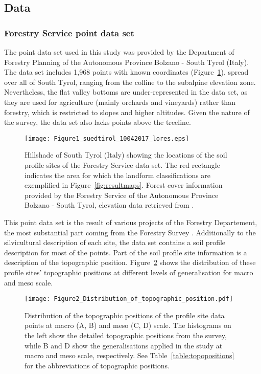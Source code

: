 \documentclass[preprint,12pt,authoryear]{elsarticle}
\begin{document}
\subsection{Data}
\subsubsection{Forestry Service point data set}
The point data set used in this study was provided by the Department of Forestry Planning of the Autonomous Province Bolzano - South Tyrol (Italy).
The data set includes 1,968 points with known coordinates (Figure~\ref{fig:datapoints}), spread over all of South Tyrol, ranging from the colline to the subalpine elevation zone. Nevertheless, the flat valley bottoms are under-represented in the data set, as they are used for agriculture (mainly orchards and vineyards) rather than forestry, which is restricted to slopes and higher altitudes. Given the nature of the survey, the data set also lacks points above the treeline.
\begin{figure}
\texttt{[image: Figure1\_suedtirol\_10042017\_lores.eps]}
\caption{Hillshade of South Tyrol (Italy) showing the locations of the soil profile sites of the Forestry Service data set. The red rectangle indicates the area for which the landform classifications are exemplified in Figure~\ref{fig:resultmaps}. Forest cover information provided by the Forestry Service of the Autonomous Province Bolzano - South Tyrol, elevation data retrieved from \cite{DTM}.}
\label{fig:datapoints}
\end{figure}
 This point data set is the result of  various projects of the Forestry Departement, the most substantial part coming from the Forestry Survey \citep{APB2006}. Additionally to the silvicultural description of each site, the data set contains a soil profile description for most of the points. Part of the soil profile site information is a description of the topographic position. Figure~\ref{fig:hist} shows the distribution of these profile sites' topographic positions at different levels of generalisation for macro and meso scale.

\begin{figure}
\texttt{[image: Figure2\_Distribution\_of\_topographic\_position.pdf]}
\caption{Distribution of the topographic positions of the profile site data points at macro (A, B) and meso (C, D) scale. The histograms on the left show the detailed topographic positions from the survey, while B and D show the generalisations applied in the study at macro and meso scale, respectively. See Table~\ref{table:topopositions} for the abbreviations of topographic positions.}
\label{fig:hist}
\end{figure}
\end{document}
